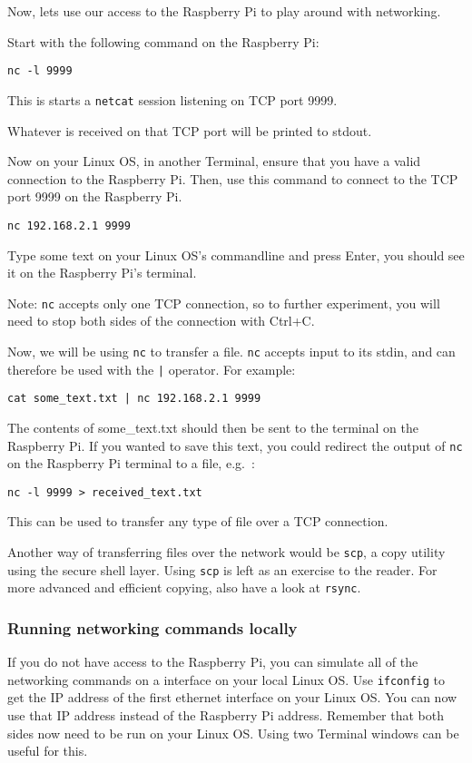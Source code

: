 \documentclass[a4paper]{article}
\begin{document}
Now, lets use our access to the Raspberry Pi to play around with networking. 

Start with the following command on the Raspberry Pi: 
\begin{lstlisting}
nc -l 9999
\end{lstlisting}
This is starts a \texttt{netcat} session listening on TCP port 9999. 

Whatever is received on that TCP port will be printed to stdout. 


Now on your Linux OS, in another Terminal, ensure that you have a valid connection to the Raspberry Pi. Then, use this command to connect to the TCP port 9999 on the Raspberry Pi. 
\begin{lstlisting}
nc 192.168.2.1 9999
\end{lstlisting}
Type some text on your Linux OS's commandline and press Enter, you should see it on the Raspberry Pi's terminal. 

Note: \texttt{nc} accepts only one TCP connection, so to further experiment, you will need to stop both sides of the connection with Ctrl+C. 

Now, we will be using \texttt{nc} to transfer a file. \texttt{nc} accepts input to its stdin, and can therefore be used with the \texttt{|} operator. For example: 
\begin{lstlisting}
cat some_text.txt | nc 192.168.2.1 9999
\end{lstlisting}
The contents of some\_text.txt should then be sent to the terminal on the Raspberry Pi. If you wanted to save this text, you could redirect the output of \texttt{nc} on the Raspberry Pi terminal to a file, e.g.\ :
\begin{lstlisting}
nc -l 9999 > received_text.txt
\end{lstlisting}
This can be used to transfer any type of file over a TCP connection. 

Another way of transferring files over the network would be \texttt{scp}, a copy utility using the secure shell layer. Using \texttt{scp} is left as an exercise to the reader. For more advanced and efficient copying, also have a look at \texttt{rsync}.

\subsubsection{Running networking commands locally}
If you do not have access to the Raspberry Pi, you can simulate all of the networking commands on a interface on your local Linux OS. Use \texttt{ifconfig} to get the IP address of the first ethernet interface on your Linux OS. You can now use that IP address instead of the Raspberry Pi address. Remember that both sides now need to be run on your Linux OS. Using two Terminal windows can be useful for this. 
\end{document}
